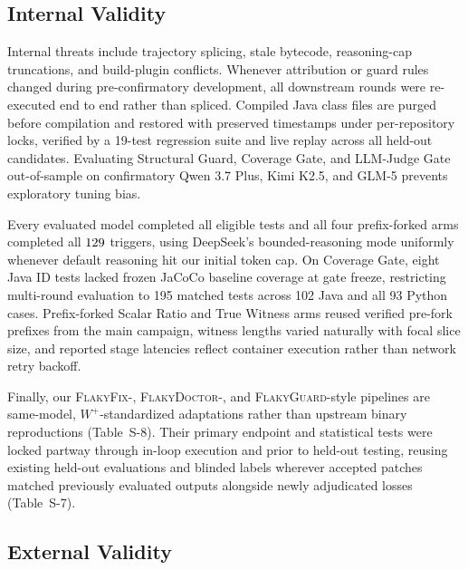\subsection{Internal Validity}

Internal threats include trajectory splicing, stale bytecode, reasoning-cap truncations, and build-plugin conflicts. Whenever attribution or guard rules changed during pre-confirmatory development, all downstream rounds were re-executed end to end rather than spliced. Compiled Java class files are purged before compilation and restored with preserved timestamps under per-repository locks, verified by a 19-test regression suite and live replay across all held-out candidates. Evaluating Structural Guard, Coverage Gate, and LLM-Judge Gate out-of-sample on confirmatory Qwen 3.7 Plus, Kimi K2.5, and GLM-5 prevents exploratory tuning bias.

Every evaluated model completed all eligible tests and all four prefix-forked arms completed all $129$ triggers, using DeepSeek's bounded-reasoning mode uniformly whenever default reasoning hit our initial token cap. On Coverage Gate, eight Java ID tests lacked frozen JaCoCo baseline coverage at gate freeze, restricting multi-round evaluation to 195 matched tests across 102 Java and all 93 Python cases. Prefix-forked Scalar Ratio and True Witness arms reused verified pre-fork prefixes from the main campaign, witness lengths varied naturally with focal slice size, and reported stage latencies reflect container execution rather than network retry backoff.

Finally, our \textsc{FlakyFix}-, \textsc{FlakyDoctor}-, and \textsc{FlakyGuard}-style pipelines are same-model, $W^+$-standardized adaptations rather than upstream binary reproductions (Table~S-8). Their primary endpoint and statistical tests were locked partway through in-loop execution and prior to held-out testing, reusing existing held-out evaluations and blinded labels wherever accepted patches matched previously evaluated outputs alongside newly adjudicated losses (Table~S-7).

\subsection{External Validity}

